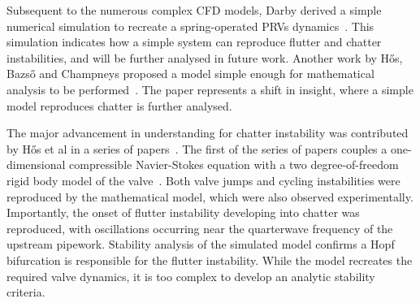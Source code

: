 Subsequent to the numerous complex CFD models, Darby derived a simple numerical simulation to recreate a spring-operated PRVs dynamics~\cite{Darby2013TheModel}. This simulation indicates how a simple system can reproduce flutter and chatter instabilities, and will be further analysed in future work. Another work by H\H{o}s, Bazs\H{o} and Champneys proposed a model simple enough for mathematical analysis to be performed~\cite{Hos2015ModelPipe}. The paper represents a shift in insight, where a simple model reproduces chatter is further analysed.


The major advancement in understanding for chatter instability was contributed by H\H{o}s et al
in a series of papers~\cite{Hos2014DynamicMechanisms,Hos2015DynamicModelling,Hos2016DynamicService,Hos2017DynamicRecommendations}. The first of the series of papers couples a one-dimensional compressible Navier-Stokes equation with a two degree-of-freedom rigid body model of the valve~\cite{Hos2014DynamicMechanisms}.
Both valve jumps and cycling instabilities were reproduced by the mathematical model, which were also observed experimentally. Importantly, the onset of flutter instability developing into chatter was reproduced, with oscillations occurring near the quarterwave frequency of the upstream pipework. Stability analysis of the simulated model confirms a Hopf bifurcation is responsible for the flutter instability. While the model recreates the required valve dynamics, it is too complex to develop an analytic stability criteria. %

